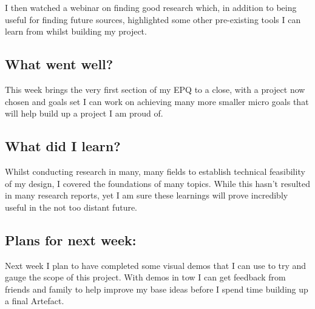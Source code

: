 I then watched a webinar on finding good research which, in addition to being useful for finding future sources, highlighted some other pre-existing tools I can learn from whilst building my project.



\subsection*{What went well?}
This week brings the very first section of my EPQ to a close, with a project now chosen and goals set I can work on achieving many more smaller micro goals that will help build up a project I am proud of.

\subsection*{What did I learn?}

Whilst conducting research in many, many fields to establish technical feasibility of my design, I covered the foundations of many topics. While this hasn't resulted in many research reports, yet I am sure these learnings will prove incredibly useful in the not too distant future.


\subsection*{Plans for next week:}
Next week I plan to have completed some visual demos that I can use to try and gauge the scope of this project.  With demos in tow I can get feedback from friends and family to help improve my base ideas before I spend time building up a final Artefact.
